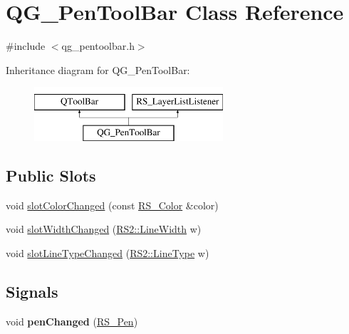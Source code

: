 \hypertarget{classQG__PenToolBar}{\section{Q\-G\-\_\-\-Pen\-Tool\-Bar Class Reference}
\label{classQG__PenToolBar}
}


{\ttfamily \#include $<$qg\-\_\-pentoolbar.\-h$>$}

Inheritance diagram for Q\-G\-\_\-\-Pen\-Tool\-Bar\-:\begin{figure}[H]
\begin{center}
\leavevmode
\includegraphics[height=2.000000cm]{classQG__PenToolBar}
\end{center}
\end{figure}
\subsection*{Public Slots}
\begin{DoxyCompactItemize}
\item 
void \hyperlink{classQG__PenToolBar_ad34dd0ca0b53de923a4749cab640484d}{slot\-Color\-Changed} (const \hyperlink{classRS__Color}{R\-S\-\_\-\-Color} \&color)
\item 
void \hyperlink{classQG__PenToolBar_a05f7f3141b40091dfc747832dc478536}{slot\-Width\-Changed} (\hyperlink{classRS2_a023485c482c5ee9e36b3dfad781adf29}{R\-S2\-::\-Line\-Width} w)
\item 
void \hyperlink{classQG__PenToolBar_a1de1a8167a592161d9409d3ff7edc309}{slot\-Line\-Type\-Changed} (\hyperlink{classRS2_a6f3a82972c2d62456f6cacb74e14c95f}{R\-S2\-::\-Line\-Type} w)
\end{DoxyCompactItemize}
\subsection*{Signals}
\begin{DoxyCompactItemize}
\item 
\hypertarget{classQG__PenToolBar_ac3cb48e5780287504c59d5d2247c6777}{void {\bfseries pen\-Changed} (\hyperlink{classRS__Pen}{R\-S\-\_\-\-Pen})}\label{classQG__PenToolBar_ac3cb48e5780287504c59d5d2247c6777}

\end{DoxyCompactItemize}
